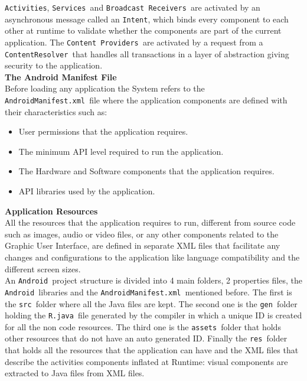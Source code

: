 \documentclass[journal]{IEEEtran}
\newcommand{\andrs}{\texttt{Android~}}
\newcommand{\amnfs}{\texttt{AndroidManifest.xml~}}
\newcommand{\cops}{\texttt{Content Providers~}}
\newcommand{\act}{\texttt{Activities}}
\newcommand{\sers}{\texttt{Services~}}
\newcommand{\bres}{\texttt{Broadcast Receivers~}}
\newcommand{\inte}{\texttt{Intent}}
\newcommand{\cors}{\texttt{ContentResolver~}}
\newcommand{\srcs}{\texttt{src~}}
\newcommand{\gens}{\texttt{gen~}}
\newcommand{\ases}{\texttt{assets~}}
\newcommand{\ress}{\texttt{res~}}
\newcommand{\rjavas}{\texttt{R.java~}}
\begin{document}
\act, \sers and \bres are activated by an asynchronous message called an \inte, which binds every component to each other at runtime 
to validate whether the components are part of the current application\cite{And}.	 The \cops  are activated by a request from a 
\cors that handles all transactions in a layer of abstraction giving security to the application.\\[1mm]

 
\textbf{The Android Manifest File}\\[1mm]
Before loading any application the System refers to the \amnfs file where the application components are defined with their 
characteristics such as:

\begin{itemize}
  \item  User permissions that the application requires.
  \item  The minimum API level required to run the application.
  \item  The Hardware and Software components that the application requires.
  \item  API libraries used by the application.\\[1mm]
\end{itemize}


\textbf{Application Resources}\\[1mm]
All the resources that the application requires to run, different from source code such as images, audio or video files, or 
any other components related to the Graphic User Interface, are defined in separate XML files that facilitate any changes 
and configurations to the application like language compatibility and the different screen sizes.\\

An \andrs project structure is divided into 4 main folders, 2 properties files, the \andrs libraries and the \amnfs mentioned 
before. The first is the \srcs folder where all the Java files are kept. The second one is the \gens folder holding the \rjavas file 
generated by the compiler in which  a unique ID is created for all the non code resources. The third one is the \ases folder that 
holds other resources that do not have an auto generated ID\cite{beginAnd}. Finally the \ress folder that holds all the resources that the application
can have and the XML files that describe the activities components inflated at Runtime: visual components are extracted to Java
files from XML files. \\
\end{document}
